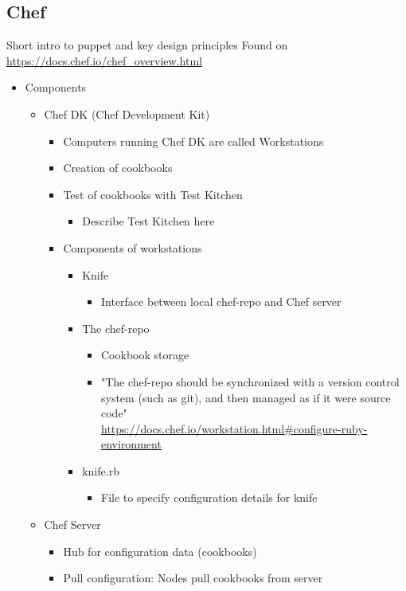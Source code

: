 \subsection{Chef}
Short intro to puppet and key design principles
Found on \url{https://docs.chef.io/chef_overview.html}
\begin{itemize}
	\item Components
	\begin{itemize}
		\item Chef DK (Chef Development Kit)
		\begin{itemize}
			\item Computers running Chef DK are called Workstations
			\item Creation of cookbooks
			\item Test of cookbooks with Test Kitchen
			\begin{itemize}
				\item Describe Test Kitchen here
			\end{itemize}
			\item Components of workstations
			\begin{itemize}
				\item Knife
				\begin{itemize}
					\item Interface between local chef-repo and Chef server
				\end{itemize}
				\item The chef-repo
				\begin{itemize}
					\item Cookbook storage
					\item "The chef-repo should be synchronized with a version control system (such as git), and then managed as if it were source code"\\ {\tiny \url{https://docs.chef.io/workstation.html#configure-ruby-environment}}
				\end{itemize}
				\item knife.rb
				\begin{itemize}
					\item File to specify configuration details for knife
				\end{itemize}
			\end{itemize}
		\end{itemize}
		\item Chef Server
		\begin{itemize}
			\item Hub for configuration data (cookbooks)
			\item Pull configuration: Nodes pull cookbooks from server

\end{itemize}
\end{itemize}
\end{itemize}
